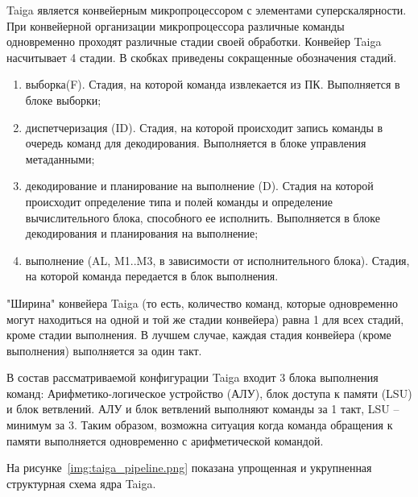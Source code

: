 Taiga является конвейерным микропроцессором с элементами суперскалярности. При конвейерной организации микропроцессора различные команды одновременно проходят различные стадии своей обработки. Конвейер Taiga насчитывает 4 стадии. В скобках приведены сокращенные обозначения стадий.

\begin{enumerate}
	\item выборка(F). Стадия, на которой команда извлекается из ПК. Выполняется в блоке выборки;
	\item диспетчеризация (ID). Стадия, на которой происходит запись команды в очередь команд для декодирования. Выполняется в блоке управления метаданными;
	\item декодирование и планирование на выполнение (D). Стадия на которой происходит определение типа и полей команды и определение вычислительного блока, способного ее исполнить. Выполняется в блоке декодирования и планирования на выполнение;
	\item выполнение (AL, M1..M3, в зависимости от исполнительного блока). Стадия, на которой команда передается в блок выполнения.	
\end{enumerate}

"Ширина" конвейера Taiga (то есть, количество команд, которые одновременно могут находиться на одной и той же стадии конвейера) равна 1 для всех стадий, кроме стадии выполнения. В лучшем случае, каждая стадия конвейера (кроме выполнения) выполняется за один такт.

В состав рассматриваемой конфигурации Taiga входит 3 блока выполнения команд: Арифметико-логическое устройство (АЛУ), блок доступа к памяти (LSU) и блок ветвлений. АЛУ и блок ветвлений выполняют команды за 1 такт, LSU -- минимум за 3. Таким образом, возможна ситуация когда команда обращения к памяти выполняется одновременно с арифметической командой.

На рисунке~\ref{img:taiga_pipeline.png} показана упрощенная и укрупненная структурная схема ядра Taiga.

\newpage